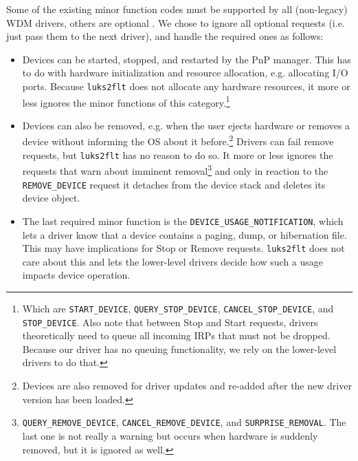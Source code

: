 Some of the existing minor function codes must be supported by all (non-legacy) WDM drivers, others are optional \cite{Kerneldriver}. We chose to ignore all optional requests (i.e. just pass them to the next driver), and handle the required ones as follows:
\begin{itemize}
	\item Devices can be started, stopped, and restarted by the PnP manager. This has to do with hardware initialization and resource allocation, e.g. allocating I/O ports. Because \texttt{luks2flt} does not allocate any hardware resources, it more or less ignores the minor functions of this category.\footnote{\label{fn:ourapproach.final.pnpstartstop} Which are \texttt{START\_DEVICE}, \texttt{QUERY\_STOP\_DEVICE}, \texttt{CANCEL\_STOP\_DEVICE}, and \texttt{STOP\_DEVICE}. Also note that between Stop and Start requests, drivers theoretically need to queue all incoming IRPs that must not be dropped. Because our driver has no queuing functionality, we rely on the lower-level drivers to do that.}
	\item Devices can also be removed, e.g. when the user ejects hardware or removes a device without informing the OS about it before.\footnote{\label{fn:ourapproach.final.removeforupdate} Devices are also removed for driver updates and re-added after the new driver version has been loaded.} Drivers can fail remove requests, but \texttt{luks2flt} has no reason to do so. It more or less ignores the requests that warn about imminent removal\footnote{\label{fn:ourapproach.final.removalwarningpnp} \texttt{QUERY\_REMOVE\_DEVICE}, \texttt{CANCEL\_REMOVE\_DEVICE}, and \texttt{SURPRISE\_REMOVAL}. The last one is not really a warning but occurs when hardware is suddenly removed, but it is ignored as well.} and only in reaction to the \texttt{REMOVE\_DEVICE} request it detaches from the device stack and deletes its device object.
	\item The last required minor function is the \texttt{DEVICE\_USAGE\_NOTIFICATION}, which lets a driver know that a device contains a paging, dump, or hibernation file. This may have implications for Stop or Remove requests. \texttt{luks2flt} does not care about this and lets the lower-level drivers decide how such a usage impacts device operation.
\end{itemize}
%
